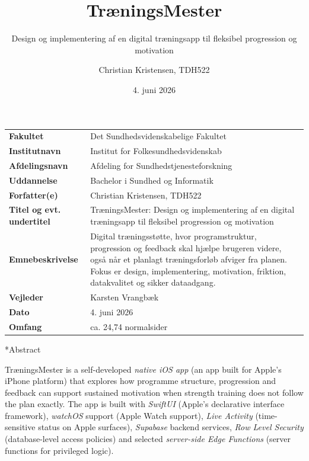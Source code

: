 \documentclass[10pt,a4paper,twoside]{article}
\author{Christian Kristensen, TDH522}
\title{TræningsMester}
\subtitle{Design og implementering af en digital træningsapp til fleksibel progression og motivation}
\date{4. juni 2026}
\makeatletter
\newif\iftmappendix
\newcommand{\tmheadinglabel}[1]{%
  \iftmappendix
    \MakeUppercase{Bilag}~#1%
  \else
    \MakeUppercase{Kapitel}~#1%
  \fi
}
\newcommand{\tmchapterheading}[2]{%
  \clearpage
  \thispagestyle{plain}%
  \begingroup
  \setlength{\parskip}{0pt}%
  \vspace*{0.8cm}%
  \noindent\hfill{\normalfont\normalsize\tmheadinglabel{#1}}\par
  \vspace{0.8ex}%
  \noindent\rule{\textwidth}{0.4pt}\par
  \vspace{0.45ex}%
  \noindent\hfill{\normalfont\normalsize\bfseries #2}\par
  \vspace{0.45ex}%
  \noindent\rule{\textwidth}{0.4pt}\par
  \endgroup
  \vspace{0.85cm}%
}
\newcommand{\tmplainheading}[1]{%
  \clearpage
  \thispagestyle{plain}%
  \begingroup
  \setlength{\parskip}{0pt}%
  \vspace*{1.4cm}%
  \noindent\rule{\textwidth}{0.4pt}\par
  \vspace{0.45ex}%
  \noindent\hfill{\normalfont\normalsize\bfseries #1}\par
  \vspace{0.45ex}%
  \noindent\rule{\textwidth}{0.4pt}\par
  \endgroup
  \vspace{0.85cm}%
}
\renewcommand\section{%
  \@ifstar{\tmsectionstar}{\tmsectionnumbered}%
}
\newcommand{\tmsectionnumbered}[1]{%
  \refstepcounter{section}%
  \addcontentsline{toc}{section}{\protect\numberline{\thesection}#1}%
  \tmchapterheading{\thesection}{#1}%
}
\newcommand{\tmsectionstar}[1]{%
  \tmplainheading{#1}%
}
\makeatother
\begin{document}
\makeprojecttitle
\makekutitle


\setcounter{page}{1}
\begin{table}[h]
\small
\renewcommand{\arraystretch}{1.18}
\begin{tabularx}{\textwidth}{>{\bfseries}p{} Y}
\toprule
Fakultet & Det Sundhedsvidenskabelige Fakultet \\
Institutnavn & Institut for Folkesundhedsvidenskab \\
Afdelingsnavn & Afdeling for Sundhedstjenesteforskning \\
Uddannelse & Bachelor i Sundhed og Informatik \\
Forfatter(e) & Christian Kristensen, TDH522 \\
Titel og evt. undertitel & TræningsMester: Design og implementering af en digital træningsapp til fleksibel progression og motivation \\
Emnebeskrivelse & Digital træningsstøtte, hvor programstruktur, progression og feedback skal hjælpe brugeren videre, også når et planlagt træningsforløb afviger fra planen. Fokus er design, implementering, motivation, friktion, datakvalitet og sikker dataadgang. \\
Vejleder & Karsten Vrangbæk \\
Dato & 4. juni 2026 \\
Omfang & ca. 24,74 normalsider \\
\bottomrule
\end{tabularx}
\end{table}
\newpage

{}
\section*{Abstract}

TræningsMester is a self-developed \emph{native iOS app} (an app built for Apple's iPhone platform) that explores how programme structure, progression and feedback can support sustained motivation when strength training does not follow the plan exactly. The app is built with \emph{SwiftUI} (Apple's declarative interface framework), \emph{watchOS} support (Apple Watch support), \emph{Live Activity} (time-sensitive status on Apple surfaces), \emph{Supabase} backend services, \emph{Row Level Security} (database-level access policies) and selected \emph{server-side Edge Functions} (server functions for privileged logic).
\end{document}
